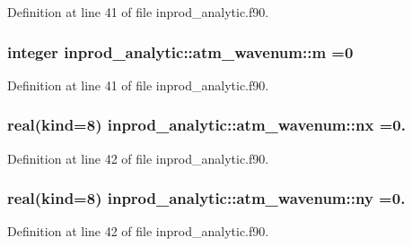 Definition at line 41 of file inprod\-\_\-analytic.\-f90.

\hypertarget{structinprod__analytic_1_1atm__wavenum_a72be0a86c5f5801b88ebf78506523bd2}{
\subsubsection[{m}]{\setlength{\rightskip}{0pt plus 5cm}integer inprod\-\_\-analytic\-::atm\-\_\-wavenum\-::m =0\hspace{0.3cm}{\ttfamily [private]}}}\label{structinprod__analytic_1_1atm__wavenum_a72be0a86c5f5801b88ebf78506523bd2}


Definition at line 41 of file inprod\-\_\-analytic.\-f90.

\hypertarget{structinprod__analytic_1_1atm__wavenum_ad67bf9989f5524b1f97dc7211ef78db2}{
\subsubsection[{nx}]{\setlength{\rightskip}{0pt plus 5cm}real(kind=8) inprod\-\_\-analytic\-::atm\-\_\-wavenum\-::nx =0.\hspace{0.3cm}{\ttfamily [private]}}}\label{structinprod__analytic_1_1atm__wavenum_ad67bf9989f5524b1f97dc7211ef78db2}


Definition at line 42 of file inprod\-\_\-analytic.\-f90.

\hypertarget{structinprod__analytic_1_1atm__wavenum_af75974631175c67689c588f6d92ceb3e}{
\subsubsection[{ny}]{\setlength{\rightskip}{0pt plus 5cm}real(kind=8) inprod\-\_\-analytic\-::atm\-\_\-wavenum\-::ny =0.\hspace{0.3cm}{\ttfamily [private]}}}\label{structinprod__analytic_1_1atm__wavenum_af75974631175c67689c588f6d92ceb3e}


Definition at line 42 of file inprod\-\_\-analytic.\-f90.

